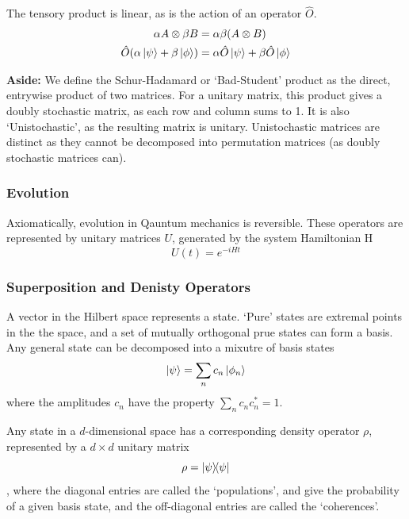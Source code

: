 \documentclass[11pt]{article}
\begin{document}
The tensory product is linear, as is the action of an operator $\hat{O}$.
\begin{align}
    \alpha A \otimes \beta B &= \alpha\beta(A\otimes B) \\
    \hat{O} (\alpha \ket{\psi} + \beta \ket{\phi}) &= \alpha\hat{O}\ket{\psi} + \beta\hat{O}\ket{\phi}
\end{align}

\hrulefill

\textbf{Aside:} We define the Schur-Hadamard or `Bad-Student' product as the direct, entrywise product of two matrices. For a unitary matrix, this product gives a doubly stochastic matrix, as each row and column sums to 1. It is also `Unistochastic', as the resulting matrix is unitary. Unistochastic matrices are distinct as they cannot be decomposed into permutation matrices (as doubly stochastic matrices can).

\hrulefill
\subsubsection*{Evolution}
Axiomatically, evolution in Qauntum mechanics is reversible. These operators are represented by unitary matrices $U$, generated by the system Hamiltonian H
\begin{equation}
    U(t) = e^{-i H t}
\end{equation}

\subsubsection*{Superposition and Denisty Operators}
A vector in the Hilbert space represents a state. `Pure' states are extremal points in the the space, and a set of mutually orthogonal prue states can form a basis. Any general state can be decomposed into a mixutre of basis states
\begin{equation}
    \ket{\psi} = \sum_{n} c_{n} \ket{\phi_{n}}
\end{equation}
where the amplitudes $c_{n}$ have the property $\sum_{n} c_{n} c_{n}^{*} = 1$.

Any state in a $d$-dimensional space has a corresponding density operator $\rho$, represented by a $d\times d$ unitary matrix
\begin{equation}
    \rho = \ketbra{\psi}{\psi}
\end{equation}
, where the diagonal entries are called the `populations', and give the probability of a given basis state, and the off-diagonal entries are called the `coherences'.
\end{document}
